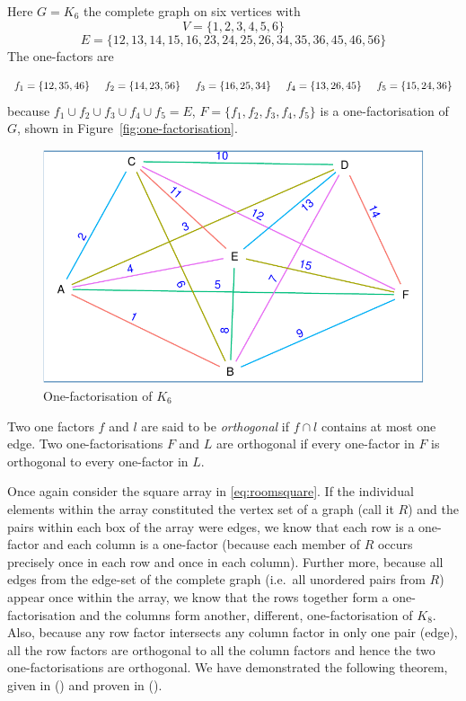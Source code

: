 \documentclass[
  11pt,
  a4paper]{book}
\newcounter{example}
\begin{document}
\begin{example}
Here
$G = K_6$
the complete graph on six vertices with
$$V = \{1, 2, 3, 4, 5, 6\}$$
$$E = \{12, 13, 14, 15, 16, 23, 24, 25, 26, 34, 35, 36, 45, 46, 56\}$$
The one-factors are

$$
f_1 = \{12, 35, 46\} \hspace{0.5cm}
f_2 = \{14, 23, 56\} \hspace{0.5cm}
f_3 = \{16, 25, 34\} \hspace{0.5cm}
f_4 = \{13, 26, 45\} \hspace{0.5cm} 
f_5 = \{15, 24, 36\}
$$
because
$f_1 \cup f_2 \cup f_3 \cup f_4 \cup f_5 = E$,
$F = \{f_1, f_2, f_3, f_4, f_5\}$
is a one-factorisation of
$G$,
shown in Figure~\ref{fig:one-factorisation}.
\end{example}

\begin{figure}
\centering
\includegraphics{figure/one-factorisation-1.pdf}
\caption{One-factorisation of \(K_6\)}
\end{figure}

Two one factors \(f\) and \(l\) are said to be \emph{orthogonal} if
\(f \cap l\) contains at most one edge. Two one-factorisations \(F\) and
\(L\) are orthogonal if every one-factor in \(F\) is orthogonal to every
one-factor in \(L\).

Once again consider the square array in \eqref{eq:roomsquare}. If the
individual elements within the array constituted the vertex set of a
graph (call it \(R\)) and the pairs within each box of the array were
edges, we know that each row is a one-factor and each column is a
one-factor (because each member of \(R\) occurs precisely once in each
row and once in each column). Further more, because all edges from the
edge-set of the complete graph (i.e.~all unordered pairs from \(R\))
appear once within the array, we know that the rows together form a
one-factorisation and the columns form another, different,
one-factorisation of \(K_8\). Also, because any row factor intersects
any column factor in only one pair (edge), all the row factors are
orthogonal to all the column factors and hence the two
one-factorisations are orthogonal. We have demonstrated the following
theorem, given in (\textcite{dinitz_contemporary_1992}) and proven in
(\textcite{nemeth_study_1969}).
\end{document}
